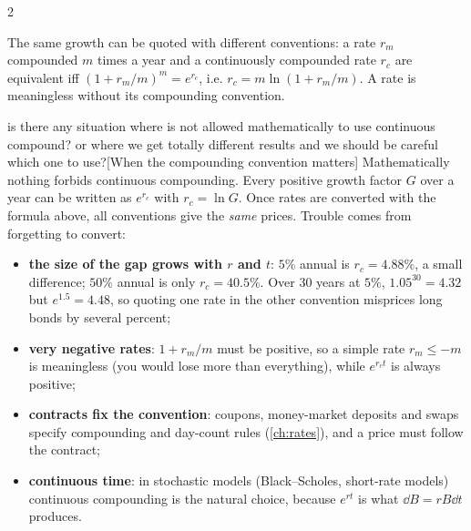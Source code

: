 \begin{paracol}{2}
\begin{remark}
The same growth can be quoted with different conventions: a rate $r_m$ compounded $m$ times a year
and a continuously compounded rate $r_c$ are equivalent iff $(1+r_m/m)^m = e^{r_c}$, i.e.
$r_c = m\ln(1+r_m/m)$. A rate is meaningless without its compounding convention.
\end{remark}\begin{answer}{is there any situation where is not allowed mathematically to use continuous compound? or where we get totally different results and we should be careful which one to use?}[When the compounding convention matters]
Mathematically nothing forbids continuous compounding. Every positive growth factor $G$ over a year
can be written as $e^{r_c}$ with $r_c=\ln G$. Once rates are converted with the formula above, all
conventions give the \emph{same} prices. Trouble comes from forgetting to convert:
\begin{itemize}
  \item \textbf{the size of the gap grows with $r$ and $t$}: $5\%$ annual is $r_c=4.88\%$, a small
        difference; $50\%$ annual is only $r_c=40.5\%$. Over 30 years at $5\%$, $1.05^{30}=4.32$ but
        $e^{1.5}=4.48$, so quoting one rate in the other convention misprices long bonds by several
        percent;
  \item \textbf{very negative rates}: $1+r_m/m$ must be positive, so a simple rate $r_m\le-m$ is
        meaningless (you would lose more than everything), while $e^{r_ct}$ is always positive;
  \item \textbf{contracts fix the convention}: coupons, money-market deposits and swaps specify
        compounding and day-count rules (\cref{ch:rates}), and a price must follow the contract;
  \item \textbf{continuous time}: in stochastic models (Black--Scholes, short-rate models)
        continuous compounding is the natural choice, because $e^{rt}$ is what $\dd B=rB\dd t$ produces.
\end{itemize}
\end{answer}


\end{paracol}

